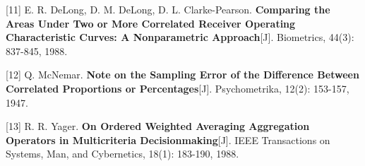 \documentclass[a4paper]{ctexart}
\makeatletter
\renewcommand{\_}{%
  \ifmmode
    \nfss@text{\textunderscore}%
  \else
    \textunderscore\discretionary{}{}{}%
  \fi}
\makeatother
\begin{document}
[11] E. R. DeLong, D. M. DeLong, D. L. Clarke-Pearson. \textbf{Comparing the Areas Under Two or More Correlated Receiver Operating Characteristic Curves: A Nonparametric Approach}[J]. Biometrics, 44(3): 837-845, 1988.


[12] Q. McNemar. \textbf{Note on the Sampling Error of the Difference Between Correlated Proportions or Percentages}[J]. Psychometrika, 12(2): 153-157, 1947.


[13] R. R. Yager. \textbf{On Ordered Weighted Averaging Aggregation Operators in Multicriteria Decisionmaking}[J]. IEEE Transactions on Systems, Man, and Cybernetics, 18(1): 183-190, 1988.
\end{document}
